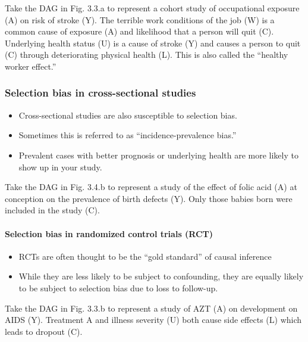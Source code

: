 \documentclass[
]{book}
\providecommand{\tightlist}{%
  \setlength{\itemsep}{0pt}\setlength{\parskip}{0pt}}
\begin{document}
Take the DAG in Fig. 3.3.a to represent a cohort study of occupational exposure (A) on risk of stroke (Y). The terrible work conditions of the job (W) is a common cause of exposure (A) and likelihood that a person will quit (C). Underlying health status (U) is a cause of stroke (Y) and causes a person to quit (C) through deteriorating physical health (L). This is also called the ``healthy worker effect.''

\hypertarget{selection-bias-in-cross-sectional-studies}{%
\subsubsection{Selection bias in cross-sectional studies}\label{selection-bias-in-cross-sectional-studies}}

\begin{itemize}
\tightlist
\item
  Cross-sectional studies are also susceptible to selection bias.
\item
  Sometimes this is referred to as ``incidence-prevalence bias.''
\item
  Prevalent cases with better prognosis or underlying health are more likely to show up in your study.
\end{itemize}

Take the DAG in Fig. 3.4.b to represent a study of the effect of folic acid (A) at conception on the prevalence of birth defects (Y). Only those babies born were included in the study (C).

\hypertarget{selection-bias-in-randomized-control-trials-rct}{%
\paragraph{Selection bias in randomized control trials (RCT)}\label{selection-bias-in-randomized-control-trials-rct}}

\begin{itemize}
\tightlist
\item
  RCTs are often thought to be the ``gold standard'' of causal inference
\item
  While they are less likely to be subject to confounding, they are equally likely to be subject to selection bias due to loss to follow-up.
\end{itemize}

Take the DAG in Fig. 3.3.b to represent a study of AZT (A) on development on AIDS (Y). Treatment A and illness severity (U) both cause side effects (L) which leads to dropout (C).
\end{document}
